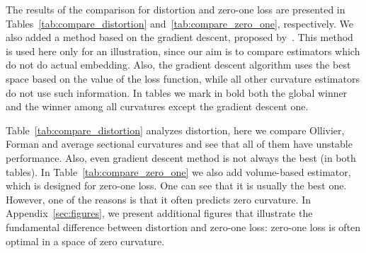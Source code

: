 \documentclass{article} %
\begin{document}
The results of the comparison for distortion and zero-one loss are presented in Tables~\ref{tab:compare_distortion} and~\ref{tab:compare_zero_one}, respectively. We also added a method based on the gradient descent, proposed by~\citet{gu2019learning}. This method is used here only for an illustration, since our aim is to compare estimators which do not do actual embedding.
Also, the gradient descent algorithm uses the best space based on the value of the loss function, while all other curvature estimators do not use such information.
In tables we mark in bold both the global winner and the winner among all curvatures except the gradient descent one. 

Table~\ref{tab:compare_distortion} analyzes distortion, here we compare Ollivier, Forman and average sectional curvatures and see that all of them have unstable performance. Also, even gradient descent method is not always the best (in both tables). In Table~\ref{tab:compare_zero_one} we also add volume-based estimator, which is designed for zero-one loss. 
One can see that it is usually the best one. 
However, one of the reasons is that it often predicts zero curvature. In Appendix~\ref{sec:figures}, we present additional figures that illustrate the fundamental difference between distortion and zero-one loss: zero-one loss is often optimal in a space of zero curvature.
\end{document}
